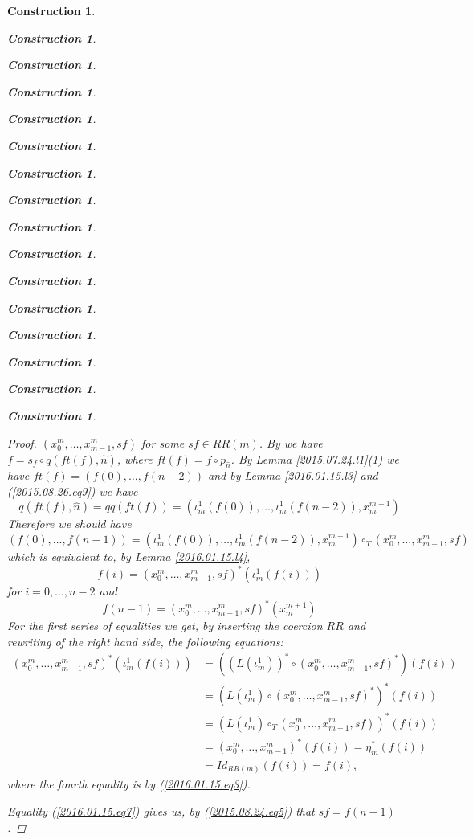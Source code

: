 \documentclass[onecolumn,12pt]{amsart}
\numberwithin{proposition}{subsection}
\newtheorem{construction}[proposition]{Construction}
\newcommand{\wh}{\widehat}
\newcommand{\mbind}[1]{{#1^*}}
\newcommand{\hc}{\circ_{T}}
\begin{document}
\begin{construction}
\begin{construction}
\begin{construction}
\begin{construction}
\begin{construction}
\begin{construction}
\begin{construction}
\begin{construction}
\begin{construction}
\begin{construction}
\begin{construction}
\begin{construction}
\begin{construction}
\begin{construction}
\begin{construction}
\begin{construction}
\begin{proof}
$(x_0^m,\dots,x_{m-1}^m,sf)$ for some $sf\in RR(m)$. By \cite[Definition
  2.3(3)]{Csubsystems} we have $f=s_f\circ q(ft(f),\wh{n})$, where $ft(f)=f\circ
p_{\wh{n}}$. By Lemma \ref{2015.07.24.l1}(1) we have
$ft(f)=(f(0),\dots,f(n-2))$ and by Lemma \ref{2016.01.15.l3} and
(\ref{2015.08.26.eq9}) we have
%
$$q(ft(f),\wh{n})=qq(ft(f))=(\iota_m^1(f(0)),\dots,\iota_m^1(f(n-2)),x_{m}^{m+1})$$
%
Therefore we should have
%
$$(f(0),\dots,f(n-1))=(\iota_m^1(f(0)),\dots,\iota_m^1(f(n-2)),x_{m}^{m+1})\hc (x_0^m,\dots,x_{m-1}^m,sf)$$
%
which is equivalent to, by Lemma \ref{2016.01.15.l4}, 
%
\begin{equation}\label{2016.01.15.eq6}
f(i)=\mbind{(x_0^m,\dots,x_{m-1}^m,sf)}(\iota_m^1(f(i)))
\end{equation}%
%
for $i=0,\dots,n-2$ and 
%
\begin{equation}\label{2016.01.15.eq7}
f(n-1)=\mbind{(x_0^m,\dots,x_{m-1}^m,sf)}(x_{m}^{m+1})
\end{equation}%
%
For the first series of equalities we get, by inserting the coercion $RR$ and
rewriting of the right hand side, the following equations:
%
\begin{equation*}
  \begin{split}
    \mbind{(x_0^m,\dots,x_{m-1}^m,sf)}(\iota_m^1(f(i)))
    &=
    (\mbind{(L(\iota_m^1))}\circ \mbind{(x_0^m,\dots,x_{m-1}^m,sf)})(f(i))
    \\&=
    \mbind{(L(\iota_m^1)\circ \mbind{(x_0^m,\dots,x_{m-1}^m,sf)})}(f(i))
    \\&=
    \mbind{(L(\iota_m^1)\hc (x_0^m,\dots,x_{m-1}^m,sf))}(f(i))
    \\&=
    \mbind{(x_0^m,\dots,x_{m-1}^m)}(f(i))=\mbind{\eta_{m}}(f(i))
    \\&=
    Id_{RR(m)}(f(i))=f(i),
  \end{split}
\end{equation*}
%
where the fourth equality is by (\ref{2016.01.15.eq3}). 

Equality (\ref{2016.01.15.eq7}) gives us, by (\ref{2015.08.24.eq5}) that $sf=f(n-1)$.
\end{proof}
%
%


\end{construction}
\end{construction}
\end{construction}
\end{construction}
\end{construction}
\end{construction}
\end{construction}
\end{construction}
\end{construction}
\end{construction}
\end{construction}
\end{construction}
\end{construction}
\end{construction}
\end{construction}
\end{construction}
\end{document}
